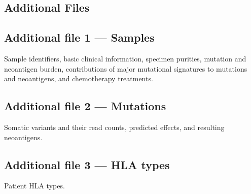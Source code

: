 \documentclass[linenumbers]{bmcart}
\begin{document}
\begin{backmatter}



\section*{Additional Files}
  \subsection*{Additional file 1 --- Samples}
    Sample identifiers, basic clinical information, specimen purities, mutation and neoantigen burden, contributions of major mutational signatures to mutations and neoantigens, and chemotherapy treatments.

  \subsection*{Additional file 2 --- Mutations}
    Somatic variants and their read counts, predicted effects, and resulting neoantigens.
  
  \subsection*{Additional file 3 --- HLA types}
    Patient HLA types.
    

\end{backmatter}
\end{document}
